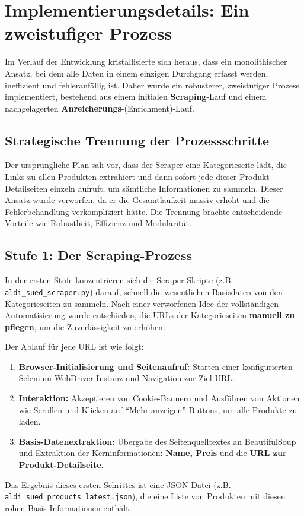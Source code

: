 \section{Implementierungsdetails: Ein zweistufiger Prozess}
\label{sec:scraping_prozess}
Im Verlauf der Entwicklung kristallisierte sich heraus, dass ein monolithischer Ansatz, bei dem alle Daten in einem einzigen Durchgang erfasst werden, ineffizient und fehleranfällig ist. Daher wurde ein robusterer, zweistufiger Prozess implementiert, bestehend aus einem initialen \textbf{Scraping}-Lauf und einem nachgelagerten \textbf{Anreicherungs}-(Enrichment)-Lauf.

\subsection{Strategische Trennung der Prozessschritte}
Der ursprüngliche Plan sah vor, dass der Scraper eine Kategorieseite lädt, die Links zu allen Produkten extrahiert und dann sofort jede dieser Produkt-Detailseiten einzeln aufruft, um sämtliche Informationen zu sammeln. Dieser Ansatz wurde verworfen, da er die Gesamtlaufzeit massiv erhöht und die Fehlerbehandlung verkompliziert hätte. Die Trennung brachte entscheidende Vorteile wie Robustheit, Effizienz und Modularität.

\subsection{Stufe 1: Der Scraping-Prozess}
In der ersten Stufe konzentrieren sich die Scraper-Skripte (z.B. \texttt{aldi\_sued\_scraper.py}) darauf, schnell die wesentlichen Basisdaten von den Kategorieseiten zu sammeln. Nach einer verworfenen Idee der vollständigen Automatisierung wurde entschieden, die URLs der Kategorieseiten \textbf{manuell zu pflegen}, um die Zuverlässigkeit zu erhöhen.

Der Ablauf für jede URL ist wie folgt:
\begin{enumerate}
    \item \textbf{Browser-Initialisierung und Seitenaufruf:} Starten einer konfigurierten Selenium-WebDriver-Instanz und Navigation zur Ziel-URL.
    \item \textbf{Interaktion:} Akzeptieren von Cookie-Bannern und Ausführen von Aktionen wie Scrollen und Klicken auf "`Mehr anzeigen"'-Buttons, um alle Produkte zu laden.
    \item \textbf{Basis-Datenextraktion:} Übergabe des Seitenquelltextes an BeautifulSoup und Extraktion der Kerninformationen: \textbf{Name, Preis} und die \textbf{URL zur Produkt-Detailseite}.
\end{enumerate}
Das Ergebnis dieses ersten Schrittes ist eine JSON-Datei (z.B. \texttt{aldi\_sued\_products\_latest.json}), die eine Liste von Produkten mit diesen rohen Basis-Informationen enthält.

